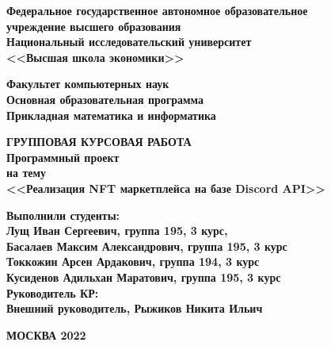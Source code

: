\begin{titlepage}
    \begin{center}
        {\bfseries Федеральное государственное автономное образовательное\\
        учреждение высшего образования\\}
        \vspace{0.5cm}
        {\bfseries Национальный исследовательский университет\\
        <<Высшая школа экономики>>\\}
        \vspace{1.5cm}

        {\bfseries Факультет компьютерных наук\\}
        \vspace{0.5cm}
        {\bfseries Основная образовательная программа\\
        Прикладная математика и информатика\\}

        \vspace{3cm}
        \textbf{ГРУППОВАЯ КУРСОВАЯ РАБОТА\\
        Программный проект\\
        на тему\\
        <<Реализация NFT маркетплейса на базе Discord API>>}


        \vspace{3cm}
    \end{center}
    \begin{flushleft}
      \textbf{Выполнили студенты:\\
      Лущ Иван Сергеевич, группа 195, 3 курс,\\
      Басалаев Максим Александрович, группа 195, 3 курс\\
      Токкожин Арсен Ардакович, группа 194, 3 курс\\
      Кусиденов Адильхан Маратович, группа 195, 3 курс
      }\\
      \vspace{1cm}
      \textbf{Руководитель КР:\\
      Внешний руководитель, Рыжиков Никита Ильич}
  \end{flushleft}
  \begin{center}
      \textbf{МОСКВА 2022}
    \end{center}
  \end{titlepage}

